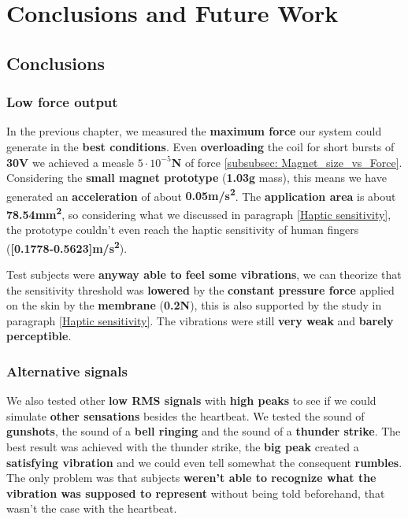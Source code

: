 
\chapter{Conclusions and Future Work}
\label{Chapter6}

\section{Conclusions}

\subsection{Low force output}
In the previous chapter, we measured the \textbf{maximum force} our system could generate in the \textbf{best conditions}.
Even \textbf{overloading} the coil for short bursts of \textbf{30V} we achieved a measle \textbf{$5\cdot10^{-5}$N} of force \ref{subsubsec: Magnet_size_vs_Force}.
Considering the \textbf{small magnet prototype} (\textbf{1.03g} mass), this means we have generated an \textbf{acceleration} of about \textbf{0.05m/s\textsuperscript{2}}.
The \textbf{application area} is about \textbf{78.54mm\textsuperscript{2}}, so considering what we discussed in paragraph \ref{Haptic sensitivity}, the prototype couldn't even reach the haptic sensitivity of human fingers (\textbf{[0.1778-0.5623]m/s\textsuperscript{2}}).

Test subjects were \textbf{anyway able to feel some vibrations}, we can theorize that the sensitivity threshold was \textbf{lowered} by the \textbf{constant pressure force} applied on the skin by the \textbf{membrane} (\textbf{0.2N}), this is also supported by the study in paragraph \ref{Haptic sensitivity}.
The vibrations were still \textbf{very weak} and \textbf{barely perceptible}.

\subsection{Alternative signals}
We also tested other \textbf{low RMS signals} with \textbf{high peaks} to see if we could simulate \textbf{other sensations} besides the heartbeat.
We tested the sound of \textbf{gunshots}, the sound of a \textbf{bell ringing} and the sound of a \textbf{thunder strike}.
The best result was achieved with the thunder strike, the \textbf{big peak} created a \textbf{satisfying vibration} and we could even tell somewhat the consequent \textbf{rumbles}.
The only problem was that subjects\textbf{ weren't able to recognize what the vibration was supposed to represent} without being told beforehand, that wasn't the case with the heartbeat.

